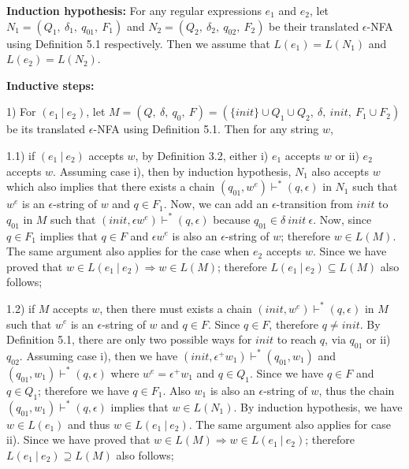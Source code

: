\documentclass[twoside,openright,final]{bhamthesis}
\begin{document}
\par \textbf{Induction hypothesis:} For any regular expressions
\(e_1\) and \(e_2\), let \(N_1 =
(Q_1,\ \delta_1,\ q_{01},\ F_1)\) and \(N_2 = (Q_2,\ \delta_2,\
q_{02},\ F_2)\) be their translated \(\epsilon\)-NFA using Definition
5.1 respectively. Then we assume that \(L(e_1) = L(N_1)\) and \(L(e_2) =
L(N_2)\). 

\par \textbf{Inductive steps:}
\par 1) For \((e_1\ |\ e_2)\), let \(M = (Q,\ \delta,\ q_0,\ F) = (\{init\} \cup Q_1 \cup Q_2,\
\delta,\ init,\ F_1 \cup F_2)\) be its translated \(\epsilon\)-NFA
using Definition 5.1. Then for any string \(w\), 

\par 1.1) if \((e_1\ |\ e_2)\) accepts \(w\), by Definition 3.2,
either i) \(e_1\) accepts \(w\) or ii) \(e_2\) accepts \(w\). Assuming case i), then by
induction hypothesis, \(N_1\) also accepts \(w\) which also implies
that there exists a chain \((q_{01} , w^e) \vdash^* (q , \epsilon)\) in \(N_1\) such that
\(w^e\) is an \(\epsilon\)-string of \(w\) and \(q \in F_1\). Now, we can
add an \(\epsilon\)-transition from \(init\) to \(q_{01}\) in \(M\)
such that \((init , \epsilon w^e) \vdash^* (q , \epsilon)\)
because \(q_{01} \in \delta\ init\ \epsilon\). Now, since \(q \in
F_1\) implies that \(q \in F\) and \(\epsilon w^e\)
is also an \(\epsilon\)-string of \(w\); therefore \(w \in L(M)\). The same argument also applies
for the case when \(e_2\) accepts \(w\). Since we have proved that \(w \in L(e_1\ |\ e_2)
\Rightarrow w \in L(M)\); therefore \(L(e_1\ |\ e_2) \subseteq L(M)\)
also follows;

\par 1.2) if \(M\) accepts \(w\), then there must exists a chain \((init , w^e) \vdash^* (q ,
\epsilon)\) in \(M\) such that \(w^e\) is an \(\epsilon\)-string of \(w\) and \(q
\in F\). Since \(q \in F\), therefore \(q \neq init\). By Definition
5.1, there are only two possible ways for \(init\) to reach \(q\), via \(q_{01}\) or ii) 
\(q_{02}\). Assuming case i), then we have \((init , \epsilon^+w_1) \vdash^*
(q_{01} , w_1)\) and \((q_{01} , w_1) \vdash^* (q , \epsilon)\) where \(w^e =
\epsilon^+w_1\) and \(q \in Q_1\). Since we have \(q \in F\) and \(q \in
Q_1\); therefore we have \(q \in F_1\). Also \(w_1\) is also an
\(\epsilon\)-string of \(w\), thus the chain \((q_{01} , w_1) \vdash^* (q , \epsilon)\)
implies that \(w \in L(N_1)\). By induction hypothesis, we have \(w \in L(e_1)\) and thus \(w \in L(e_1\
|\ e_2)\). The same argument also applies for case ii). Since we have
proved that \(w \in
L(M) \Rightarrow w \in L(e_1\ |\ e_2)\); therefore \(L(e_1\ |\ e_2)
\supseteq L(M)\) also follows;
\end{document}
